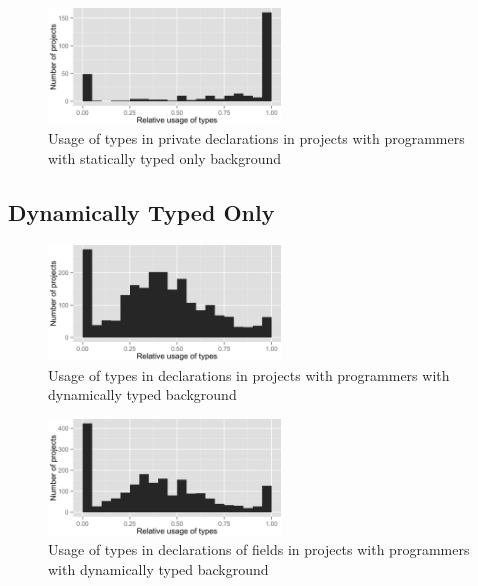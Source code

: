 \begin{figure}[h]
\centering 
\includegraphics[width=0.55\textwidth]{../aosd_2014/analysis/result/background/static-only/histograms/11_Private.png} 
\caption{Usage of types in private declarations in projects with programmers with statically typed only background}
\end{figure}

\FloatBarrier

\subsection*{Dynamically Typed Only}

\begin{figure}[h]
\centering 
\includegraphics[width=0.55\textwidth]{../aosd_2014/analysis/result/background/dynamic-only/histograms/5_all_types.png} 
\caption{Usage of types in declarations in projects with programmers with dynamically typed background}
\end{figure}

\begin{figure}[h]
\centering 
\includegraphics[width=0.55\textwidth]{../aosd_2014/analysis/result/background/dynamic-only/histograms/10_Field.png} 
\caption{Usage of types in declarations of fields in projects with programmers with dynamically typed background}
\end{figure}

